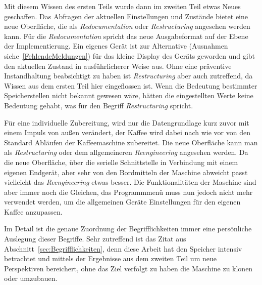 Mit diesem Wissen des ersten Teils wurde dann im zweiten Teil etwas Neues geschaffen.
Das Abfragen der aktuellen Einstellungen und Zustände bietet eine neue Oberfläche, die als \textit{Redocumentation} oder \textit{Restructuring} angesehen werden kann.
Für die \textit{Redocumentation} spricht das neue Ausgabeformat auf der Ebene der Implementierung.
Ein eigenes Gerät ist zur Alternative (Ausnahmen siehe~\ref{FehlendeMeldungen}) für das kleine Display des Geräts geworden und gibt den aktuellen Zustand in ausführlicherer Weise aus.
Ohne eine präventive Instandhaltung beabsichtigt zu haben ist \textit{Restructuring} aber auch zutreffend, da Wissen aus dem ersten Teil hier eingeflossen ist.
Wenn die Bedeutung bestimmter Speicherstellen nicht bekannt gewesen wäre, hätten die eingestellten Werte keine Bedeutung gehabt, was für den Begriff \textit{Restructuring} spricht.

Für eine individuelle Zubereitung, wird nur die Datengrundlage kurz zuvor mit einem Impuls von außen verändert, der Kaffee wird dabei nach wie vor von den Standard Abläufen der Kaffeemaschine zubereitet.
Die neue Oberfläche kann man als \textit{Restructuring} oder dem allgemeineren \textit{Reengineering} angesehen werden.
Da die neue Oberfläche, über die serielle Schnittstelle in Verbindung mit einem eigenen Endgerät, aber sehr von den Bordmitteln der Maschine abweicht passt vielleicht das \textit{Reengineering} etwas besser.
Die Funktionalitäten der Maschine sind aber immer noch die Gleichen, das Programmmenü muss nun jedoch nicht mehr verwendet werden, um die allgemeinen Geräte Einstellungen für den eigenen Kaffee anzupassen.

Im Detail ist die genaue Zuordnung der Begrifflichkeiten immer eine persönliche Auslegung dieser Begriffe.
Sehr zutreffend ist das Zitat aus Abschnitt~\ref{sec:Begrifflichkeiten}, denn diese Arbeit hat den Speicher intensiv betrachtet und mittels der Ergebnisse aus dem zweiten Teil um neue Perspektiven bereichert, ohne das Ziel verfolgt zu haben die Maschine zu klonen oder umzubauen.
